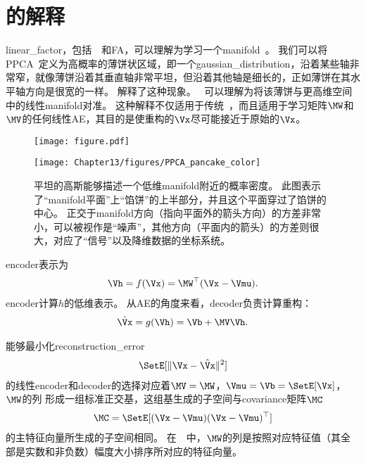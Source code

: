 

\section{的解释}
\label{sec:manifold_interpretation_of_pca}


\gls{linear_factor}，包括~~和\gls{FA}，可以理解为学习一个\gls{manifold}~\citep{hinton97modelling}。
我们可以将\gls{PPCA}~定义为高概率的薄饼状区域，即一个\gls{gaussian_distribution}，沿着某些轴非常窄，就像薄饼沿着其垂直轴非常平坦，但沿着其他轴是细长的，正如薄饼在其水平轴方向是很宽的一样。
解释了这种现象。
~可以理解为将该薄饼与更高维空间中的线性\gls{manifold}对准。
这种解释不仅适用于传统~，而且适用于学习矩阵$\MW$和$\MV$的任何线性\gls{AE}，其目的是使重构的$\Vx$尽可能接近于原始的$\Vx$。

\begin{figure}[!htb]
\ifOpenSource
\centerline{\texttt{[image: figure.pdf]}}
\else
	\centerline{\texttt{[image: Chapter13/figures/PPCA\_pancake\_color]}}
\fi
\caption{平坦的高斯能够描述一个低维\gls{manifold}附近的概率密度。
此图表示了``\gls{manifold}平面''上``馅饼''的上半部分，并且这个平面穿过了馅饼的中心。
正交于\gls{manifold}方向（指向平面外的箭头方向）的方差非常小，可以被视作是``噪声''，其他方向（平面内的箭头）的方差则很大，对应了``信号''以及降维数据的坐标系统。}
\label{fig:PPCA_pancake}
\end{figure}


\gls{encoder}表示为
\begin{align}
\label{eqn:1319}
\Vh  = f(\Vx) = \MW^{\top} (\Vx - \Vmu).
\end{align}%
\gls{encoder}计算$h$的低维表示。
从\gls{AE}的角度来看，\gls{decoder}负责计算重构：
\begin{align}
\label{eqn:1320}
\hat{\Vx} = g(\Vh) = \Vb + \MV \Vh.
\end{align}


能够最小化\gls{reconstruction_error}
\begin{align}
\label{eqn:1321}
\SetE[\Vert\Vx - \hat{\Vx}\Vert^2]
\end{align}
的线性\gls{encoder}和\gls{decoder}的选择对应着$\MV = \MW$，${\Vmu} = \Vb = \SetE[\Vx]$， $\MW$的列 形成一组标准正交基，这组基生成的子空间与\gls{covariance}矩阵$\MC$
\begin{align}
\label{eqn:1322}
\MC = \SetE[(\Vx - {\Vmu})(\Vx - {\Vmu})^{\top}]
\end{align}
的主特征向量所生成的子空间相同。
在~~中，$\MW$的列是按照对应特征值（其全部是实数和非负数）幅度大小排序所对应的特征向量。

